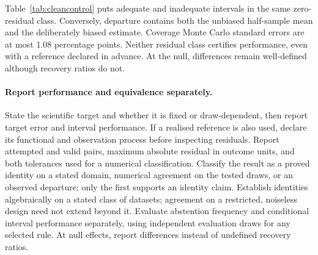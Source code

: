 Table~\ref{tab:cleancontrol} puts adequate and inadequate intervals in the same
zero-residual class. Conversely, departure contains both the unbiased
half-sample mean and the deliberately biased estimate. Coverage Monte Carlo
standard errors are at most 1.08 percentage points. Neither residual class
certifies performance, even with a reference declared in advance. At the
null, differences remain well-defined although recovery ratios do not.


\paragraph{Report performance and equivalence separately.}
State the scientific target and whether it is fixed or draw-dependent, then
report target error and interval performance. If a realised reference is also
used, declare its functional and observation process before inspecting
residuals. Report attempted and valid pairs, maximum absolute residual in outcome units,
and both tolerances used for a numerical classification. Classify the result
as a proved identity on a stated domain, numerical agreement on the tested
draws, or an observed departure; only the first supports an identity claim. Establish identities algebraically
on a stated class of datasets; agreement on a restricted, noiseless design need
not extend beyond it. Evaluate abstention frequency and conditional interval
performance separately, using independent evaluation draws for any selected
rule. At null effects, report differences instead of undefined recovery ratios.
